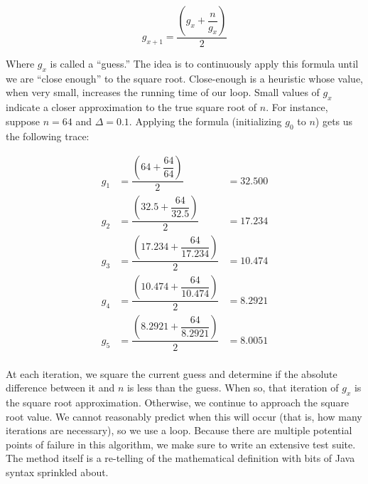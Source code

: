 
\[
    g_{x+1} = \dfrac{\left(g_x + \dfrac{n}{g_x}\right)}{2}
\]

Where $g_x$ is called a ``guess.'' The idea is to continuously apply this formula until we are ``close enough'' to the square root. Close-enough is a heuristic whose value, when very small, increases the running time of our loop. Small values of $g_x$ indicate a closer approximation to the true square root of $n$. For instance, suppose $n=64$ and $\Delta=0.1$. Applying the formula (initializing $g_0$ to $n$) gets us the following trace:

\begin{align*}
g_1 &= \dfrac{\left(64 + \dfrac{64}{64}\right)}{2} &= 32.500\\
g_2 &= \dfrac{\left(32.5 + \dfrac{64}{32.5}\right)}{2} &= 17.234\\
g_3 &= \dfrac{\left(17.234 + \dfrac{64}{17.234}\right)}{2} &= 10.474\\
g_4 &= \dfrac{\left(10.474 + \dfrac{64}{10.474}\right)}{2} &= 8.2921\\
g_5 &= \dfrac{\left(8.2921 + \dfrac{64}{8.2921}\right)}{2} &= 8.0051\\
\end{align*}

At each iteration, we square the current guess and determine if the absolute difference between it and $n$ is less than the guess. When so, that iteration of $g_x$ is the square root approximation. Otherwise, we continue to approach the square root value. We cannot reasonably predict when this will occur (that is, how many iterations are necessary), so we use a  loop. Because there are multiple potential points of failure in this algorithm, we make sure to write an extensive test suite. The method itself is a re-telling of the mathematical definition with bits of Java syntax sprinkled about. 

